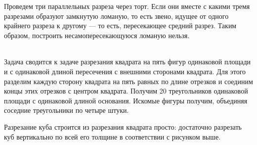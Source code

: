 ﻿
\begin{itemize}

\itA Проведем три параллельных разреза через торт. Если они вместе с какими тремя разрезами образуют замкнутую ломаную, то есть звено, идущее от одного крайнего разреза к другому — то есть, пересекающее средний разрез. Таким образом, построить несамопересекающуюся ломаную нельзя.

\itB $\phantom{x}$
\vspace{-0.5cm}
\begin{center}\end{center}
\vspace{0.2cm}

\itC Задача сводится к задаче разрезания квадрата на пять фигур одинаковой площади и с одинаковой длиной пересечения с внешними сторонами квадрата. Для этого разделим каждую сторону квадрата на пять равных по длине отрезков и соединим концы этих отрезков с центром квадрата. Получим 20 треугольников одинаковой площади с одинаковой длиной основания. Искомые фигуры получим, объединяя соседние треугольники по четыре штуки.

\medskip
\begin{center}  \end{center}

Разрезание куба строится из разрезания квадрата просто: достаточно разрезать куб вертикально по всей его толщине в соответствии с рисунком выше.
\end{itemize}

